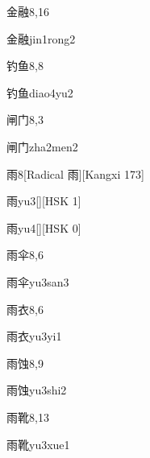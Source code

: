 \begin{entry}{金融}{8,16}
  \begin{phonetics}{金融}{jin1rong2}
  \end{phonetics}
\end{entry}

\begin{entry}{钓鱼}{8,8}
  \begin{phonetics}{钓鱼}{diao4yu2}
  \end{phonetics}
\end{entry}

\begin{entry}{闸门}{8,3}
  \begin{phonetics}{闸门}{zha2men2}
  \end{phonetics}
\end{entry}

\begin{entry}{雨}{8}[Radical 雨][Kangxi 173]
  \begin{phonetics}{雨}{yu3}[][HSK 1]
  \end{phonetics}
  \begin{phonetics}{雨}{yu4}[][HSK 0]
  \end{phonetics}
\end{entry}

\begin{entry}{雨伞}{8,6}
  \begin{phonetics}{雨伞}{yu3san3}
  \end{phonetics}
\end{entry}

\begin{entry}{雨衣}{8,6}
  \begin{phonetics}{雨衣}{yu3yi1}
  \end{phonetics}
\end{entry}

\begin{entry}{雨蚀}{8,9}
  \begin{phonetics}{雨蚀}{yu3shi2}
  \end{phonetics}
\end{entry}

\begin{entry}{雨靴}{8,13}
  \begin{phonetics}{雨靴}{yu3xue1}
  \end{phonetics}
\end{entry}

